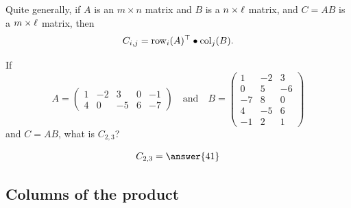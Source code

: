 \documentclass{ximera}
\begin{document}
Quite generally, if $A$ is an $m\times n$ matrix and $B$ is a $n\times
\ell$ matrix, and $C = AB$ is a $m\times \ell$ matrix, then
\[
C_{i,j} = \operatorname{row}_i(A)^\top\bullet \operatorname{col}_j(B).
\]
\begin{question} If
  \[
  A = \begin{pmatrix}
1 & -2 & 3 & 0 & -1 \\
4 & 0 & -5 & 6 & -7
  \end{pmatrix}\quad\text{and}\quad
  B=
  \begin{pmatrix}
1 & -2 & 3 \\
0 & 5 & -6 \\
-7 & 8 & 0 \\
4 & -5 & 6 \\
-1 & 2 & 1
\end{pmatrix}
  \]
  and $C = AB$, what is $C_{2,3}$?
  \begin{prompt}
    \[
    C_{2,3} = \answer{41}
    \]
  \end{prompt}
\end{question}







\subsection{Columns of the product}
\end{document}
